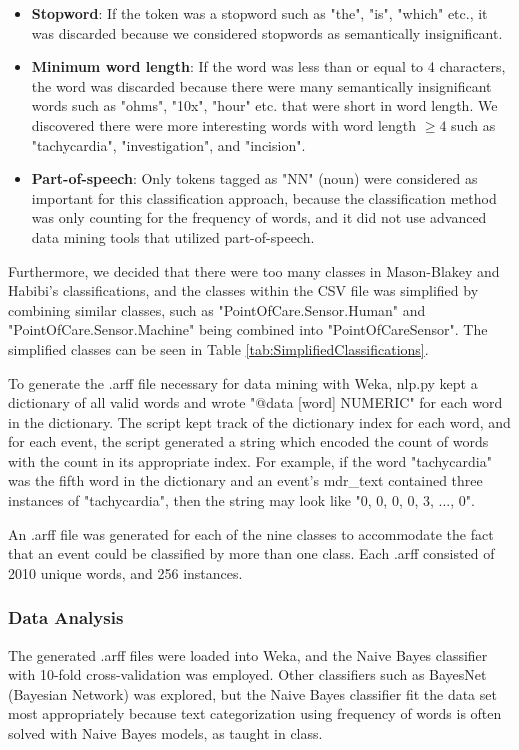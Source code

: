 \documentclass[11pt, notitlepage,abstracton,oneside]{article}   	%
\begin{document}
\begin{itemize}
	\item \textbf{Stopword}: If the token was a stopword such as "the", "is", "which" etc., it was discarded because we considered stopwords as semantically insignificant.
	\item \textbf{Minimum word length}: If the word was less than or equal to 4 characters, the word was discarded because there were many semantically insignificant words such as "ohms", "10x", "hour" etc. that were short in word length. We discovered there were more interesting words with word length $\geq 4$ such as "tachycardia", "investigation", and "incision".
	\item \textbf{Part-of-speech}: Only tokens tagged as "NN" (noun) were considered as important for this classification approach, because the classification method was only counting for the frequency of words, and it did not use advanced data mining tools that utilized part-of-speech.
\end{itemize}

Furthermore, we decided that there were too many classes in Mason-Blakey and Habibi's classifications, and the classes within the CSV file was simplified by combining similar classes, such as "PointOfCare.Sensor.Human" and "PointOfCare.Sensor.Machine" being combined into "PointOfCareSensor". The simplified classes can be seen in Table \ref{tab:SimplifiedClassifications}. 

To generate the .arff file necessary for data mining with Weka, nlp.py kept a dictionary of all valid words and wrote "@data [word] NUMERIC" for each word in the dictionary. The script kept track of the dictionary index for each word, and for each event, the script generated a string which encoded the count of words with the count in its appropriate index. For example, if the word "tachycardia" was the fifth word in the dictionary and an event's mdr\_text contained three instances of "tachycardia", then the string may look like "0, 0, 0, 0, 3, ..., 0".

An .arff file was generated for each of the nine classes to accommodate the fact that an event could be classified by more than one class. Each .arff consisted of 2010 unique words, and 256 instances.

\subsubsection{Data Analysis}
The generated .arff files were loaded into Weka, and the Naive Bayes classifier with 10-fold cross-validation was employed. Other classifiers such as BayesNet (Bayesian Network) was explored, but the Naive Bayes classifier fit the data set most appropriately because text categorization using frequency of words is often solved with Naive Bayes models, as taught in class.
\end{document}
